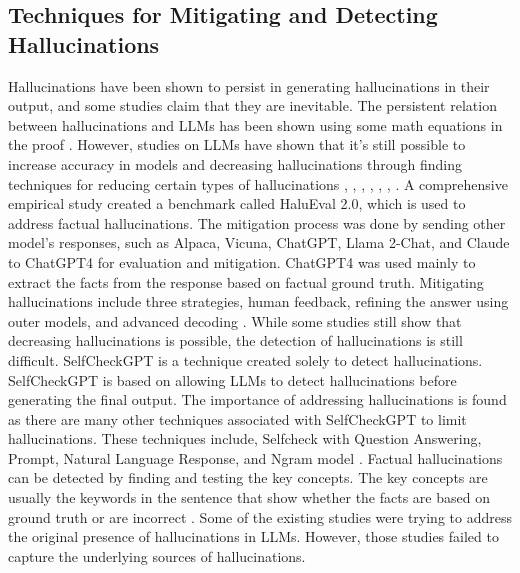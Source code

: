 \documentclass[twocolumn]{article}
\begin{document}
\subsection{Techniques for Mitigating and Detecting Hallucinations}
Hallucinations have been shown to persist in generating hallucinations in their output, and some studies claim that they are inevitable. The persistent relation between hallucinations and LLMs has been shown using some math equations in the proof \cite{xu2024hallucination}. However, studies on LLMs have shown that it’s still possible to increase accuracy in models and decreasing hallucinations through finding techniques for reducing certain types of hallucinations \cite{wang2023overview}, \cite{liu2025attention}, \cite{manakul2023selfcheckgpt}, \cite{varshney2023selfcritiquing}, \cite{simhi2025highcertainty}, \cite{li2024dawn}, \cite{varshney2023validating}. A comprehensive empirical study created a benchmark called HaluEval 2.0, which is used to address factual hallucinations. The mitigation process was done by sending other model’s responses, such as Alpaca, Vicuna, ChatGPT, Llama 2-Chat, and Claude to ChatGPT4 for evaluation and mitigation. ChatGPT4 was used mainly to extract the facts from the response based on factual ground truth. Mitigating hallucinations include three strategies, human feedback, refining the answer using outer models, and advanced decoding \cite{li2024dawn}.  While some studies still show that decreasing hallucinations is possible, the detection of hallucinations is still difficult.
SelfCheckGPT is a technique created solely to detect hallucinations. SelfCheckGPT is based on allowing LLMs to detect hallucinations before generating the final output. The importance of addressing hallucinations is found as there are many other techniques associated with SelfCheckGPT to limit hallucinations. These techniques include, Selfcheck with Question Answering, Prompt, Natural Language Response, and Ngram model \cite{varshney2023validating}.  Factual hallucinations can be detected by finding and testing the key concepts. The key concepts are usually the keywords in the sentence that show whether the facts are based on ground truth or are incorrect \cite{varshney2023hallucinations}. Some of the existing studies were trying to address the original presence of hallucinations in LLMs.  However, those studies failed to capture the underlying sources of hallucinations. 
\end{document}
